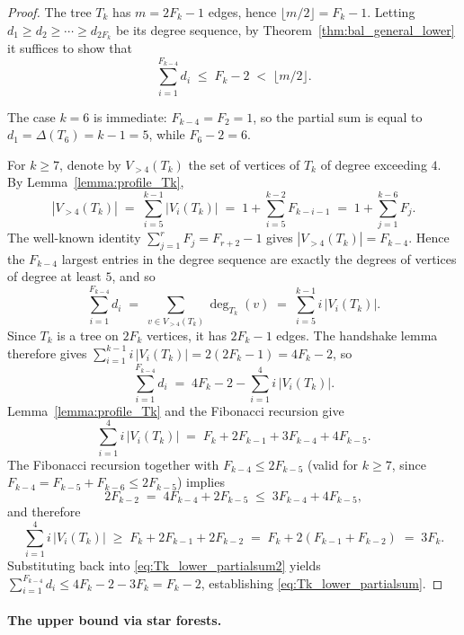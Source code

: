 \begin{proof}
    The tree $T_k$ has $m=2F_k-1$ edges, hence $\lfloor m/2\rfloor=F_k-1$.
    Letting $d_1\geq d_2\geq\cdots\geq d_{2F_k}$ be its degree sequence, by Theorem~\ref{thm:bal_general_lower} it suffices to show that
    \begin{equation}\label{eq:Tk_lower_partialsum}
        \sum_{i=1}^{F_{k-4}}d_i\;\leq\;F_k-2\;<\;\lfloor m/2\rfloor.
    \end{equation}

    The case $k=6$ is immediate: $F_{k-4}=F_2=1$, so the partial sum is equal to $d_1=\Delta(T_6)=k-1=5$, while $F_6-2=6$.

    For $k\geq 7$, denote by $V_{>4}(T_k)$ the set of vertices of $T_k$ of degree exceeding $4$.
    By Lemma~\ref{lemma:profile_Tk},
    $$
        |V_{>4}(T_k)|\;=\;\sum_{i=5}^{k-1}|V_i(T_k)|\;=\;1+\sum_{i=5}^{k-2}F_{k-i-1}\;=\;1+\sum_{j=1}^{k-6}F_j.
    $$
    The well-known identity $\sum_{j=1}^{r}F_j=F_{r+2}-1$ gives $|V_{>4}(T_k)|=F_{k-4}$.
    Hence the $F_{k-4}$ largest entries in the degree sequence are exactly the degrees of vertices of degree at least $5$, and so
    $$
        \sum_{i=1}^{F_{k-4}}d_i\;=\;\sum_{v\in V_{>4}(T_k)}\deg_{T_k}(v)\;=\;\sum_{i=5}^{k-1}i\,|V_i(T_k)|.
    $$
    Since $T_k$ is a tree on $2F_k$ vertices, it has $2F_k-1$ edges.
    The handshake lemma therefore gives $\sum_{i=1}^{k-1}i\,|V_i(T_k)|=2(2F_k-1)=4F_k-2$, so
    \begin{equation}\label{eq:Tk_lower_partialsum2}
        \sum_{i=1}^{F_{k-4}}d_i\;=\;4F_k-2-\sum_{i=1}^{4}i\,|V_i(T_k)|.
    \end{equation}
    Lemma~\ref{lemma:profile_Tk} and the Fibonacci recursion give
    $$
        \sum_{i=1}^4 i\,|V_i(T_k)|\;=\;F_k+2F_{k-1}+3F_{k-4}+4F_{k-5}.
    $$
    The Fibonacci recursion together with $F_{k-4}\leq 2F_{k-5}$ (valid for $k\geq 7$, since $F_{k-4}=F_{k-5}+F_{k-6}\leq 2F_{k-5}$) implies
    $$
        2F_{k-2}\;=\;4F_{k-4}+2F_{k-5}\;\leq\;3F_{k-4}+4F_{k-5},
    $$
    and therefore
    $$
        \sum_{i=1}^4 i\,|V_i(T_k)|\;\geq\;F_k+2F_{k-1}+2F_{k-2}\;=\;F_k+2(F_{k-1}+F_{k-2})\;=\;3F_k.
    $$
    Substituting back into \eqref{eq:Tk_lower_partialsum2} yields $\sum_{i=1}^{F_{k-4}}d_i\leq 4F_k-2-3F_k=F_k-2$, establishing \eqref{eq:Tk_lower_partialsum}.
\end{proof}

\paragraph{The upper bound via star forests.}

